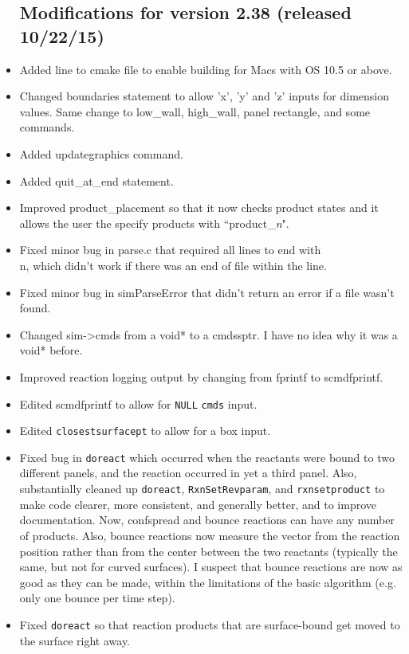 \documentclass {scrbook}
\newcommand {\ttt} {\texttt}
\begin{document}
\begin{itemize}
\subsection{Modifications for version 2.38 (released 10/22/15)}
\item Added line to cmake file to enable building for Macs with OS 10.5 or above.
\item Changed boundaries statement to allow 'x', 'y' and 'z' inputs for dimension values. Same change to low\_wall, high\_wall, panel rectangle, and some commands.
\item Added updategraphics command.
\item Added quit\_at\_end statement.
\item Improved product\_placement so that it now checks product states and it allows the user the specify products with ``product\_\textit{n}".
\item Fixed minor bug in parse.c that required all lines to end with \\n, which didn't work if there was an end of file within the line.
\item Fixed minor bug in simParseError that didn't return an error if a file wasn't found.
\item Changed sim->cmds from a void* to a cmdssptr. I have no idea why it was a void* before.
\item Improved reaction logging output by changing from fprintf to scmdfprintf.
\item Edited scmdfprintf to allow for \ttt{NULL} \ttt{cmds} input.
\item Edited \ttt{closestsurfacept} to allow for a box input.
\item Fixed bug in \ttt{doreact} which occurred when the reactants were bound to two different panels, and the reaction occurred in yet a third panel. Also, substantially cleaned up \ttt{doreact}, \ttt{RxnSetRevparam}, and \ttt{rxnsetproduct} to make code clearer, more consistent, and generally better, and to improve documentation. Now, confspread and bounce reactions can have any number of products. Also, bounce reactions now measure the vector from the reaction position rather than from the center between the two reactants (typically the same, but not for curved surfaces). I suspect that bounce reactions are now as good as they can be made, within the limitations of the basic algorithm (e.g. only one bounce per time step).
\item Fixed \ttt{doreact} so that reaction products that are surface-bound get moved to the surface right away.

\end{itemize}
\end{document}
